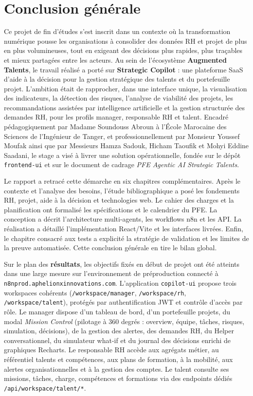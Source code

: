 \chapter*{Conclusion générale}

Ce projet de fin d'études s'est inscrit dans un contexte où la transformation numérique pousse les organisations à consolider des données RH et projet de plus en plus volumineuses, tout en exigeant des décisions plus rapides, plus traçables et mieux partagées entre les acteurs. Au sein de l'écosystème \textbf{Augmented Talents}, le travail réalisé a porté sur \textbf{Strategic Copilot} : une plateforme SaaS d'aide à la décision pour la gestion stratégique des talents et du portefeuille projet. L'ambition était de rapprocher, dans une interface unique, la visualisation des indicateurs, la détection des risques, l'analyse de viabilité des projets, les recommandations assistées par intelligence artificielle et la gestion structurée des demandes RH, pour les profils manager, responsable RH et talent. Encadré pédagogiquement par Madame Soundouss Abroun à l'École Marocaine des Sciences de l'Ingénieur de Tanger, et professionnellement par Monsieur Youssef Moufak ainsi que par Messieurs Hamza Sadouk, Hicham Taoufik et Mohyi Eddine Saadani, le stage a visé à livrer une solution opérationnelle, fondée sur le dépôt \texttt{frontend-ui} et sur le document de cadrage \emph{PFE Agentic AI Strategic Talents}.

Le rapport a retracé cette démarche en six chapitres complémentaires. Après le contexte et l'analyse des besoins, l'étude bibliographique a posé les fondements RH, projet, aide à la décision et technologies web. Le cahier des charges et la planification ont formalisé les spécifications et le calendrier du PFE. La conception a décrit l'architecture multi-agents, les workflows n8n et les API. La réalisation a détaillé l'implémentation React/Vite et les interfaces livrées. Enfin, le chapitre consacré aux tests a explicité la stratégie de validation et les limites de la preuve automatisée. Cette conclusion générale en tire le bilan global.

Sur le plan des \textbf{résultats}, les objectifs fixés en début de projet ont été atteints dans une large mesure sur l'environnement de préproduction connecté à \texttt{n8nprod.aphelionxinnovations.com}. L'application \texttt{copilot-ui} propose trois workspaces cohérents (\texttt{/workspace/manager}, \texttt{/workspace/rh}, \texttt{/workspace/talent}), protégés par authentification JWT et contrôle d'accès par rôle. Le manager dispose d'un tableau de bord, d'un portefeuille projets, du modal \emph{Mission Control} (pilotage à 360 degrés : overview, équipe, tâches, risques, simulation, décisions), de la gestion des alertes, des demandes RH, du Helper conversationnel, du simulateur what-if et du journal des décisions enrichi de graphiques Recharts. Le responsable RH accède aux agrégats métier, au référentiel talents et compétences, aux plans de formation, à la mobilité, aux alertes organisationnelles et à la gestion des comptes. Le talent consulte ses missions, tâches, charge, compétences et formations via des endpoints dédiés \texttt{/api/workspace/talent/*}.


